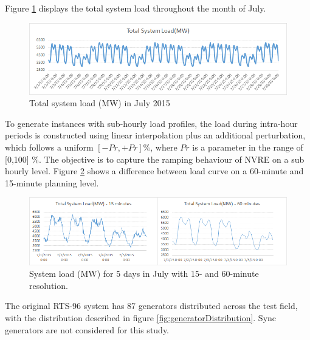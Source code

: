 \documentclass[12pt,LUDisStyle,twosided]{book}
\begin{document}
Figure \ref{fig:totalSystemLoadJuly} displays the total system load throughout the month of July.

\begin{figure}[h] 
  \includegraphics[width=\textwidth,keepaspectratio]{totalSystemLoadJuly.png}
  \caption{Total system load (MW) in July 2015}
  \label{fig:totalSystemLoadJuly}
\end{figure}

To generate instances with sub-hourly load profiles, the load during intra-hour periods is constructed using linear interpolation plus an additional perturbation, which follows a uniform $[-Pr,+Pr]\%$, where $Pr$ is a parameter in the range of [0,100] \%. The objective is to capture the ramping behaviour of NVRE on a sub hourly level. Figure \ref{fig:perturbationDifference} shows a difference between load curve on a 60-minute and 15-minute planning level. 

\begin{figure}[h] 
  \includegraphics[keepaspectratio]{perturbationDifference.png}
  \caption{System load (MW) for 5 days in July with 15- and 60-minute resolution.}
  \label{fig:perturbationDifference}
\end{figure}

The original RTS-96 system has 87 generators distributed across the test field, with the distribution described in figure \ref{fig:generatorDistribution}. Sync generators are not considered for this study.
\end{document}
